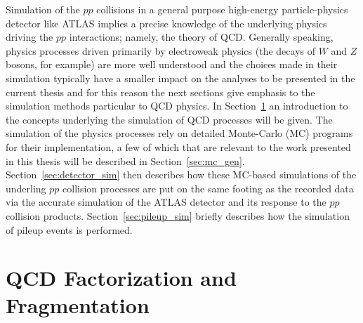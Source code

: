 Simulation of the $pp$ collisions in a general purpose high-energy particle-physics detector
like ATLAS implies a precise knowledge of the underlying physics driving the $pp$ interactions; namely,
the theory of QCD.
Generally speaking, physics processes driven primarily by electroweak physics (the decays of $W$ and $Z$ bosons, for example)
are more well understood and the choices made in their simulation typically have a smaller impact
on the analyses to be presented in the current thesis and for this reason the next sections give
emphasis to
the simulation methods particular to QCD physics.
In Section~\ref{sec:fact_frag} an introduction to the concepts underlying the simulation of QCD
processes will be given.
The simulation of the physics processes rely on detailed Monte-Carlo (MC) programs for their implementation,
a few of which that are relevant to the work presented in this thesis will be described in Section~\ref{sec:mc_gen}.
Section~\ref{sec:detector_sim} then describes how these MC-based simulations of the underling $pp$ collision processes
are put on the same footing as the recorded data via the accurate simulation of the ATLAS
detector and its response to the $pp$ collision products.
Section~\ref{sec:pileup_sim} briefly describes how the simulation of pileup events is performed.



\section{QCD Factorization and Fragmentation}
\label{sec:fact_frag}

